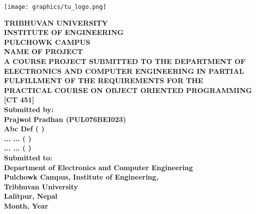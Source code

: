 \documentclass[main]{subfiles}
\begin{document}
\begin{titlepage}
	\begin{center}

	\texttt{[image: graphics/tu\_logo.png]}

\textbf{	TRIBHUVAN UNIVERSITY\\
	INSTITUTE OF ENGINEERING\\
	PULCHOWK CAMPUS}\\
	[2cm]

\textbf{	NAME OF PROJECT   }\\
	[2cm]

\textbf{	A COURSE PROJECT SUBMITTED TO THE DEPARTMENT OF ELECTRONICS AND COMPUTER ENGINEERING IN PARTIAL FULFILLMENT OF THE REQUIREMENTS FOR THE PRACTICAL COURSE ON OBJECT ORIENTED PROGRAMMING [CT 451]}\\
	[2cm]

\textbf{	Submitted by:\\
	Prajwol Pradhan (PUL076BEI023)\\
	Abc Def (   )\\
	... ... (   )\\
	... ... (   )}\\
	[1cm]

\textbf{Submitted to:\\
	Department of Electronics and Computer Engineering\\
	Pulchowk Campus, 	Institute of Engineering,\\ 
	Tribhuvan University\\
	Lalitpur, Nepal}\\
	[1.5cm]

\textbf{	Month, Year}

	\end{center}
\end{titlepage} 
\end{document}
